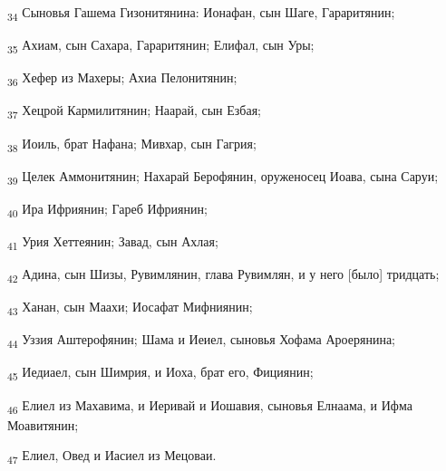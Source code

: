 \begin{tcolorbox}
\textsubscript{34} Сыновья Гашема Гизонитянина: Ионафан, сын Шаге, Гараритянин;
\end{tcolorbox}
\begin{tcolorbox}
\textsubscript{35} Ахиам, сын Сахара, Гараритянин; Елифал, сын Уры;
\end{tcolorbox}
\begin{tcolorbox}
\textsubscript{36} Хефер из Махеры; Ахиа Пелонитянин;
\end{tcolorbox}
\begin{tcolorbox}
\textsubscript{37} Хецрой Кармилитянин; Наарай, сын Езбая;
\end{tcolorbox}
\begin{tcolorbox}
\textsubscript{38} Иоиль, брат Нафана; Мивхар, сын Гагрия;
\end{tcolorbox}
\begin{tcolorbox}
\textsubscript{39} Целек Аммонитянин; Нахарай Берофянин, оруженосец Иоава, сына Саруи;
\end{tcolorbox}
\begin{tcolorbox}
\textsubscript{40} Ира Ифриянин; Гареб Ифриянин;
\end{tcolorbox}
\begin{tcolorbox}
\textsubscript{41} Урия Хеттеянин; Завад, сын Ахлая;
\end{tcolorbox}
\begin{tcolorbox}
\textsubscript{42} Адина, сын Шизы, Рувимлянин, глава Рувимлян, и у него [было] тридцать;
\end{tcolorbox}
\begin{tcolorbox}
\textsubscript{43} Ханан, сын Маахи; Иосафат Мифниянин;
\end{tcolorbox}
\begin{tcolorbox}
\textsubscript{44} Уззия Аштерофянин; Шама и Иеиел, сыновья Хофама Ароерянина;
\end{tcolorbox}
\begin{tcolorbox}
\textsubscript{45} Иедиаел, сын Шимрия, и Иоха, брат его, Фициянин;
\end{tcolorbox}
\begin{tcolorbox}
\textsubscript{46} Елиел из Махавима, и Иеривай и Иошавия, сыновья Елнаама, и Ифма Моавитянин;
\end{tcolorbox}
\begin{tcolorbox}
\textsubscript{47} Елиел, Овед и Иасиел из Мецоваи.
\end{tcolorbox}
